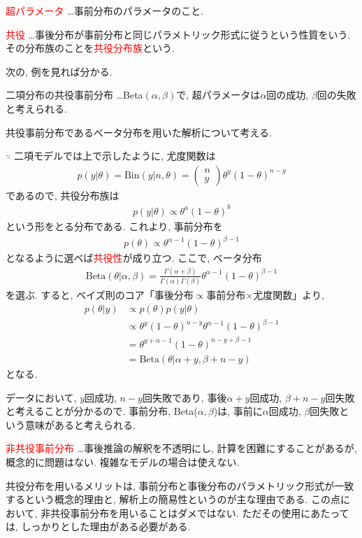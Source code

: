 \documentclass[11pt,a4pape,dvipdfmx]{jarticle}
\newcommand{\eqn}[1]{\begin{align*}#1\end{align*}}
\newcommand{\tcr}[1]{\textcolor{red}{#1}}
\begin{document}
\begin{itembox}[l]{\tcr{超パラメータ}}
…事前分布のパラメータのこと.
\end{itembox}


\begin{itembox}[l]{\tcr{共役}}
…事後分布が事前分布と同じパラメトリック形式に従うという性質をいう.
その分布族のことを\tcr{共役分布族}という.
\end{itembox}

次の, 例を見れば分かる.


\begin{itembox}[l]{二項分布の共役事前分布}
…Beta$(\alpha,\beta)$で, 超パラメータは$\alpha$回の成功, $\beta$回の失敗と考えられる.
\end{itembox}
共役事前分布であるベータ分布を用いた解析について考える.

$\because$
二項モデルでは上で示したように, 尤度関数は
\eqn{p(y|\theta)=\text{Bin}(y|n,\theta)=\left(\begin{array}{c}n\\y\end{array}\right)\theta^y(1-\theta)^{n-y}}
であるので, 共役分布族は
\eqn{p(y|\theta)\propto \theta^a (1-\theta)^b}
という形をとる分布である.
これより, 事前分布を
\eqn{p(\theta)\propto \theta^{\alpha-1} (1-\theta)^{\beta-1}}
となるように選べば\tcr{共役性}が成り立つ.
ここで, ベータ分布
\eqn{\text{Beta}(\theta|\alpha,\beta)=\frac{\Gamma(\alpha+\beta)}{\Gamma(\alpha)\Gamma(\beta)}\theta^{\alpha-1} (1-\theta)^{\beta-1}}
を選ぶ.
すると, ベイズ則のコア「事後分布$\propto$事前分布$\times$尤度関数」より,
\eqn{p(\theta|y)
&\propto p(\theta)p(y|\theta)\\
&\propto \theta^y (1-\theta)^{n-y} \theta^{\alpha-1} (1-\theta)^{\beta-1}\\
&=\theta^{y+\alpha-1} (1-\theta)^{n-y+\beta-1}\\
&=\text{Beta}(\theta|\alpha+y,\beta+n-y)}
となる.

データにおいて, $y$回成功, $n-y$回失敗であり, 事後$\alpha+y$回成功, $\beta+n-y$回失敗と考えることが分かるので.
事前分布, Beta($\alpha,\beta$)は, 事前に$\alpha$回成功, $\beta$回失敗という意味があると考えられる.


\begin{itembox}[l]{\tcr{非共役事前分布}}
…事後推論の解釈を不透明にし, 計算を困難にすることがあるが, 概念的に問題はない.
複雑なモデルの場合は使えない.
\end{itembox}

共役分布を用いるメリットは, 事前分布と事後分布のパラメトリック形式が一致するという概念的理由と, 解析上の簡易性というのが主な理由である.
この点において, 非共役事前分布を用いることはダメではない.
ただその使用にあたっては, しっかりとした理由がある必要がある.
\end{document}
